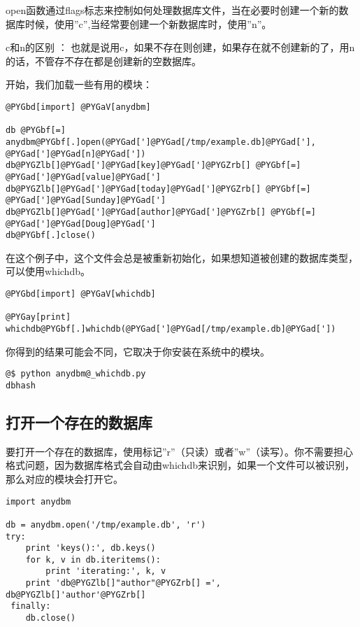\documentclass[letterpaper,10pt,english]{manual}
\begin{document}
open函数通过flags标志来控制如何处理数据库文件，当在必要时创建一个新的数据库时候，使用''c'',当经常要创建一个新数据库时，使用''n''。

c和n的区别 ：
也就是说用c，如果不存在则创建，如果存在就不创建新的了，用n的话，不管存不存在都是创建新的空数据库。

开始，我们加载一些有用的模块：

\begin{Verbatim}[commandchars=@\[\]]
@PYGbd[import] @PYGaV[anydbm]

db @PYGbf[=] anydbm@PYGbf[.]open(@PYGad[']@PYGad[/tmp/example.db]@PYGad['], @PYGad[']@PYGad[n]@PYGad['])
db@PYGZlb[]@PYGad[']@PYGad[key]@PYGad[']@PYGZrb[] @PYGbf[=] @PYGad[']@PYGad[value]@PYGad[']
db@PYGZlb[]@PYGad[']@PYGad[today]@PYGad[']@PYGZrb[] @PYGbf[=] @PYGad[']@PYGad[Sunday]@PYGad[']
db@PYGZlb[]@PYGad[']@PYGad[author]@PYGad[']@PYGZrb[] @PYGbf[=] @PYGad[']@PYGad[Doug]@PYGad[']
db@PYGbf[.]close()
\end{Verbatim}

在这个例子中，这个文件会总是被重新初始化，如果想知道被创建的数据库类型，可以使用whichdb。

\begin{Verbatim}[commandchars=@\[\]]
@PYGbd[import] @PYGaV[whichdb]

@PYGay[print] whichdb@PYGbf[.]whichdb(@PYGad[']@PYGad[/tmp/example.db]@PYGad['])
\end{Verbatim}

你得到的结果可能会不同，它取决于你安装在系统中的模块。

\begin{Verbatim}[commandchars=@\[\]]
@$ python anydbm@_whichdb.py
dbhash
\end{Verbatim}


\subsection{打开一个存在的数据库}

要打开一个存在的数据库，使用标记''r''（只读）或者''w''（读写）。你不需要担心格式问题，因为数据库格式会自动由whichdb来识别，如果一个文件可以被识别，那么对应的模块会打开它。

\begin{Verbatim}[commandchars=@\[\]]
import anydbm

db = anydbm.open('/tmp/example.db', 'r')
try:
    print 'keys():', db.keys()
    for k, v in db.iteritems():
        print 'iterating:', k, v
    print 'db@PYGZlb[]"author"@PYGZrb[] =', db@PYGZlb[]'author'@PYGZrb[]
 finally:
    db.close()
\end{Verbatim}
\end{document}
